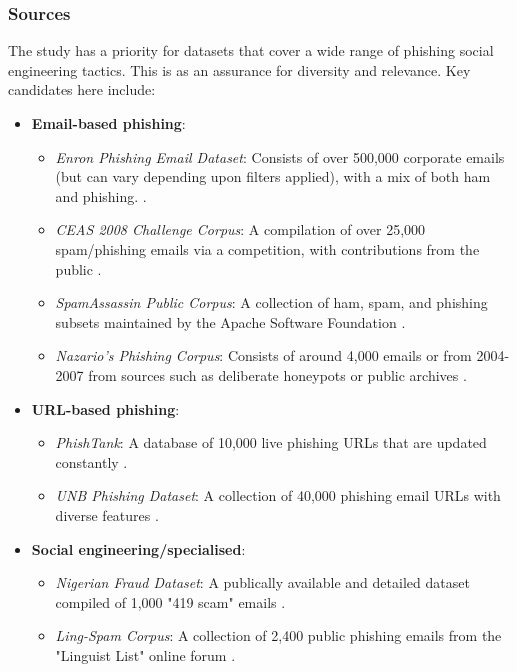 
\subsubsection*{Sources}
The study has a priority for datasets that cover a wide range of phishing social engineering tactics. This is as an assurance for diversity and relevance. Key candidates here include:

\begin{itemize}
  \item \textbf{Email-based phishing}:
  \begin{itemize}
    \item \textit{Enron Phishing Email Dataset}: Consists of over 500,000 corporate emails (but can vary depending upon filters applied), with a mix of both ham and phishing. \citep{klimt2004enron}.
    \item \textit{CEAS 2008 Challenge Corpus}: A compilation of over 25,000 spam/phishing emails via a competition, with contributions from the public \citep{cormack2008email}.
    \item \textit{SpamAssassin Public Corpus}: A collection of ham, spam, and phishing subsets maintained by the Apache Software Foundation \citep{spamassassin2003}.
    \item \textit{Nazario's Phishing Corpus}: Consists of around 4,000 emails or from 2004-2007 from sources such as deliberate honeypots or public archives \citep{nazario2007phishing}.
  \end{itemize}
\item \textbf{URL-based phishing}:
\begin{itemize}
  \item \textit{PhishTank}: A database of 10,000 live phishing URLs that are updated constantly \citep{phishTank2023}.
  \item \textit{UNB Phishing Dataset}: A collection of 40,000 phishing email URLs with diverse features \citep{unb2016phishing}.
\end{itemize}
\item \textbf{Social engineering/specialised}:
  \begin{itemize}
    \item \textit{Nigerian Fraud Dataset}: A publically available and detailed dataset compiled of 1,000 "419 scam" emails \citep{champa2024phishing}.
    \item \textit{Ling-Spam Corpus}: A collection of 2,400 public phishing emails from the "Linguist List" online forum \citep{ling2005spam}.
  \end{itemize}
\end{itemize}

